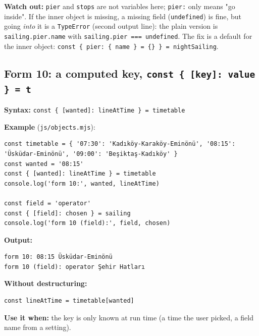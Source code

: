 \documentclass[
  10pt,
]{article}
\begin{document}
\textbf{Watch out:} \texttt{pier} and \texttt{stops} are not variables
here; \texttt{pier:\allowbreak{}} only means "go inside". If the inner
object is missing, a missing field (\texttt{undefined}) is fine, but
going \emph{into} it is a \texttt{TypeError} (second output line): the
plain version is \texttt{sailing.\allowbreak{}pier.\allowbreak{}name}
with
\texttt{sailing.\allowbreak{}pier =\allowbreak{}=\allowbreak{}=\allowbreak{} undefined}.
The fix is a default for the inner object:
\texttt{const \{ pier:\allowbreak{} \{ name \} =\allowbreak{} \{\} \} =\allowbreak{} nightSailing}.

\hypertarget{form-10-a-computed-key-const--key-value---t}{%
\subsection{\texorpdfstring{Form 10: a computed key,
\texttt{const \{ [\allowbreak{}key]:\allowbreak{} value \} =\allowbreak{} t}}{Form 10: a computed key, }}\label{form-10-a-computed-key-const--key-value---t}}

\textbf{Syntax:}
\texttt{const \{ [\allowbreak{}wanted]:\allowbreak{} lineAtTime \} =\allowbreak{} timetable}

\textbf{Example} (\texttt{js/\allowbreak{}objects.\allowbreak{}mjs}):

\begin{verbatim}
const timetable = { '07:30': 'Kadıköy-Karaköy-Eminönü', '08:15': 'Üsküdar-Eminönü', '09:00': 'Beşiktaş-Kadıköy' }
const wanted = '08:15'
const { [wanted]: lineAtTime } = timetable
console.log('form 10:', wanted, lineAtTime)

const field = 'operator'
const { [field]: chosen } = sailing
console.log('form 10 (field):', field, chosen)
\end{verbatim}

\textbf{Output:}

\begin{verbatim}
form 10: 08:15 Üsküdar-Eminönü
form 10 (field): operator Şehir Hatları
\end{verbatim}

\textbf{Without destructuring:}

\begin{verbatim}
const lineAtTime = timetable[wanted]
\end{verbatim}

\textbf{Use it when:} the key is only known at run time (a time the user
picked, a field name from a setting).
\end{document}
